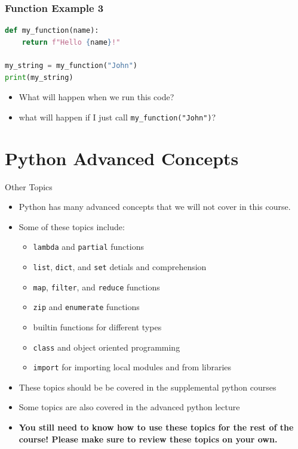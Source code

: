 \documentclass[aspectratio=169]{beamer}
\begin{document}
\begin{frame}[fragile]
    \frametitle{Function Example 3}
    \begin{lstlisting}[language=Python, caption={Function Example 3}]
def my_function(name):
    return f"Hello {name}!"

my_string = my_function("John")
print(my_string)
\end{lstlisting}

    \begin{itemize}
        \item What will happen when we run this code?
        \item what will happen if I just call \texttt{my\_function("John")}?
    \end{itemize}
\end{frame}

\section{Python Advanced Concepts}

\begin{frame}{Other Topics}
    \begin{itemize}
        \item Python has many advanced concepts that we will not cover in this course.
        \item Some of these topics include:
              \begin{itemize}
                  \item \texttt{lambda} and \texttt{partial} functions
                  \item \texttt{list}, \texttt{dict}, and \texttt{set} detials and comprehension
                  \item \texttt{map}, \texttt{filter}, and \texttt{reduce} functions
                  \item \texttt{zip} and \texttt{enumerate} functions
                  \item builtin functions for different types
                  \item \texttt{class} and object oriented programming
                  \item\texttt{import} for importing local modules and from libraries
              \end{itemize}
        \item These topics should be be covered in the supplemental python courses
        \item Some topics are also covered in the advanced python lecture
        \item \textbf{You still need to know how to use these topics for the rest of the course! Please make sure to review these topics on your own.}
    \end{itemize}
\end{frame}
\end{document}
